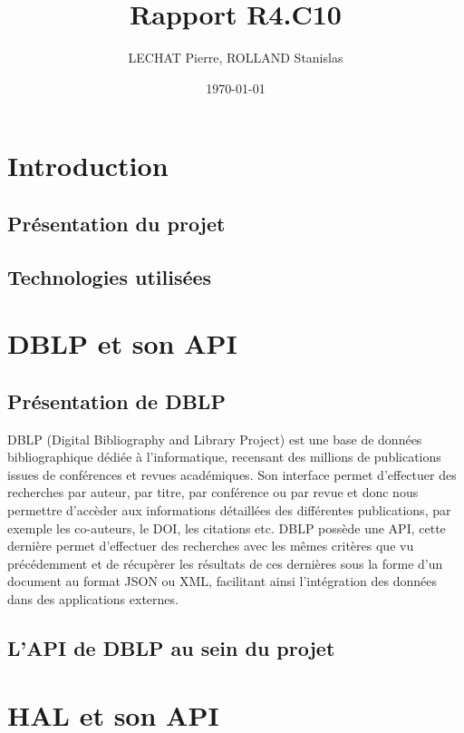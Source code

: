 \documentclass[a4paper,12pt]{article}
\title{Rapport R4.C10} %
\author{LECHAT Pierre, ROLLAND Stanislas}
\date{\today}
\begin{document}
\maketitle  
\tableofcontents  
\newpage          


\section{Introduction}
\subsection{Présentation du projet}
  
\subsection{Technologies utilisées}


\section{DBLP et son API}

\subsection{Présentation de DBLP}
DBLP (Digital Bibliography and Library Project) est une base de données bibliographique dédiée à l’informatique, recensant des millions de publications issues de conférences et revues académiques. 
Son interface permet d’effectuer des recherches par auteur, par titre, par conférence ou par revue et donc nous permettre d'accèder aux informations détaillées des différentes publications, par exemple les co-auteurs, le DOI, 
les citations etc. DBLP possède une API, cette dernière permet d'effectuer des recherches avec les mêmes critères que vu précédemment et de récupèrer les résultats de ces dernières sous la forme d'un document au format JSON ou XML,
facilitant ainsi l'intégration des données dans des applications externes.

\subsection{L'API de DBLP au sein du projet}


\section{HAL et son API}
\end{document}
